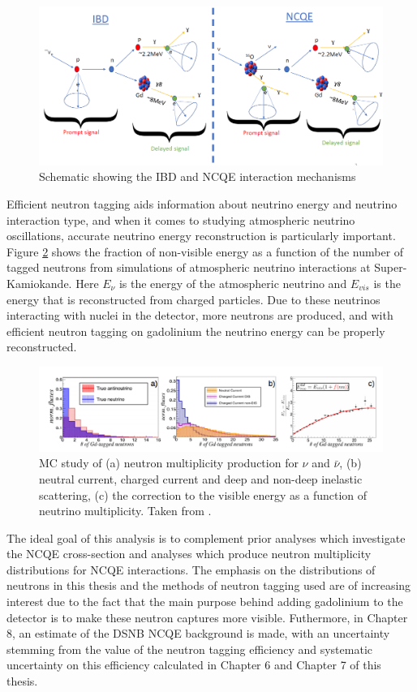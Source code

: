 \begin{figure}
    \centering
    \includegraphics[width=\textwidth]{Figures/schematic.png}
\caption{Schematic showing the IBD and NCQE interaction mechanisms}
\label{fig:NCQE_IBD}
\end{figure}


Efficient neutron tagging aids information about neutrino energy and neutrino interaction type, and when it comes to studying atmospheric neutrino oscillations, accurate neutrino energy reconstruction is particularly important. Figure \ref{fig:atm_nu_energy} shows the fraction of non-visible energy as a function of the number of tagged neutrons from simulations of atmospheric neutrino interactions at Super-Kamiokande. Here $E_{\nu}$ is the energy of the atmospheric neutrino and $E_{vis}$ is the energy that is reconstructed from charged particles. Due to these neutrinos interacting with nuclei in the detector, more neutrons are produced, and with efficient neutron tagging on gadolinium the neutrino energy can be properly reconstructed. 

\begin{figure}
\centering
\includegraphics[width=1.1\textwidth]{Figures/atm_recon_energy.png}
\caption{MC study of (a) neutron multiplicity production for $\nu$ and ${\bar{\nu}}$, (b) neutral current, charged current and deep and non-deep inelastic scattering, (c) the correction to the visible energy as a function of neutrino multiplicity. Taken from \cite{marti_evaluation_2020}.}
\label{fig:atm_nu_energy}
\end{figure}



The ideal goal of this analysis is to complement prior analyses which investigate the NCQE cross-section and analyses which produce neutron multiplicity distributions for NCQE interactions. The emphasis on the distributions of neutrons in this thesis and the methods of neutron tagging used are of increasing interest due to the fact that the main purpose behind adding gadolinium to the detector is to make these neutron captures more visible. Futhermore, in Chapter 8, an estimate of the DSNB NCQE background is made, with an uncertainty stemming from the value of the neutron tagging efficiency and systematic uncertainty on this efficiency calculated in Chapter 6 and Chapter 7 of this thesis.


